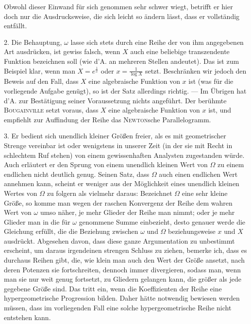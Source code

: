 Obwohl dieser Einwand für sich genommen sehr schwer wiegt, betrifft er hier doch nur die Ausdrucksweise, die sich leicht so ändern lässt, dass er vollständig entfällt.

2. Die Behauptung, $\omega$ lasse sich stets durch eine Reihe der von ihm angegebenen Art ausdrücken, ist gewiss falsch, wenn $X$ auch eine beliebige transzendente Funktion bezeichnen soll (wie d'A. an mehreren Stellen andeutet). Das ist zum Beispiel klar, wenn man $X=e^{\frac1x}$ oder $x=\frac1{\log X}$ setzt. Beschränken wir jedoch den Beweis auf den Fall, dass $X$ eine algebraische Funktion von $x$ ist (was für die vorliegende Aufgabe genügt), so ist der Satz allerdings richtig. --- Im Übrigen hat d'A. zur Bestätigung seiner Voraussetzung nichts angeführt. Der berühmte \textsc{Bougainville} setzt voraus, dass $X$ eine algebraische Funktion von $x$ ist, und empfiehlt zur Auffindung der Reihe das \textsc{Newton}sche Parallelogramm.

3. Er bedient sich unendlich kleiner Größen freier, als es mit geometrischer Strenge vereinbar ist oder wenigstens in unserer Zeit (in der sie mit Recht in schlechtem Ruf stehen) von einem gewissenhaften Analysten zugestanden würde. Auch erläutert er den Sprung von einem unendlich kleinen Wert von $\Omega$ zu einem endlichen nicht deutlich genug. Seinen Satz, dass $\Omega$ auch einen endlichen Wert annehmen kann, scheint er weniger aus der Möglichkeit eines unendlich kleinen Wertes von $\Omega$ zu folgern als vielmehr daraus: Bezeichnet $\Omega$ eine sehr kleine Größe, so komme man wegen der raschen Konvergenz der Reihe dem wahren Wert von $\omega$ umso näher, je mehr Glieder der Reihe man nimmt; oder je mehr Glieder man in die für $\omega$ genommene Summe einbezieht, desto genauer werde die Gleichung erfüllt, die die Beziehung zwischen $\omega$ und $\Omega$ beziehungsweise $x$ und $X$ ausdrückt. Abgesehen davon, dass diese ganze Argumentation zu unbestimmt erscheint, um daraus irgendeinen strengen Schluss zu ziehen, bemerke ich, dass es durchaus Reihen gibt, die, wie klein man auch den Wert der Größe ansetzt,
nach deren Potenzen sie fortschreiten, dennoch immer divergieren, sodass man, wenn man sie nur weit genug fortsetzt, zu Gliedern gelangen kann, die größer als jede gegebene Größe sind. Das tritt ein, wenn die Koeffizienten der Reihe eine hypergeometrische Progression bilden. Daher hätte notwendig bewiesen werden müssen, dass im vorliegenden Fall eine solche hypergeometrische Reihe nicht entstehen kann.


